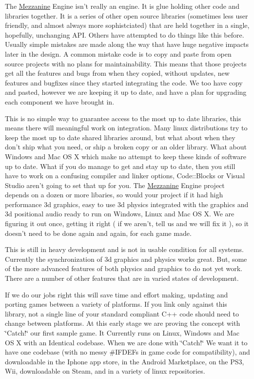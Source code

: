 The \hyperlink{namespaceMezzanine}{Mezzanine} Engine isn't really an engine. It is glue holding other code and libraries together. It is a series of other open source libraries (sometimes less user friendly, and almost always more sophistciated) that are held together in a single, hopefully, unchanging API. Others have attempted to do things like this before. Usually simple mistakes are made along the way that have huge negative impacts later in the design. A common mistake code is to copy and paste from open source projects with no plans for maintainability. This means that those projects get all the features and bugs from when they copied, without updates, new features and bugfixes since they started integrating the code. We too have copy and pasted, however we are keeping it up to date, and have a plan for upgrading each component we have brought in.

This is no simple way to guarantee access to the most up to date libraries, this means there will meaningful work on integration. Many linux distributions try to keep the most up to date shared libraries around, but what about when they don't ship what you need, or ship a broken copy or an older library. What about Windows and Mac OS X which make no attempt to keep these kinds of software up to date. What if you do manage to get and stay up to date, then you still have to work on a confusing compiler and linker options, Code::Blocks or Visual Studio aren't going to set that up for you. The \hyperlink{namespaceMezzanine}{Mezzanine} Engine project depends on a dozen or more libaries, so would your project if it had high performance 3d graphics, easy to use 3d physics integrated with the graphics and 3d positional audio ready to run on Windows, Linux and Mac OS X. We are figuring it out once, getting it right ( if we aren't, tell us and we will fix it ), so it doesn't need to be done again and again, for each game made.

This is still in heavy development and is not in usable condition for all systems. Currently the synchronization of 3d graphics and physics works great. But, some of the more advanced features of both physics and graphics to do not yet work. There are a number of other features that are in varied states of development.

If we do our jobs right this will save time and effort making, updating and porting games between a variety of platforms. If you link only against this library, not a single line of your standard compliant C++ code should need to change between platforms. At this early stage we are proving the concept with \char`\"{}Catch!\char`\"{} our first sample game. It Currently runs on Linux, Windows and Mac OS X with an Identical codebase. When we are done with \char`\"{}Catch!\char`\"{} We want it to have one codebase (with no messy \#IFDEFs in game code for compatibility), and downloadable in the Iphone app store, in the Android Marketplace, on the PS3, Wii, downloadable on Steam, and in a variety of linux repositories.


